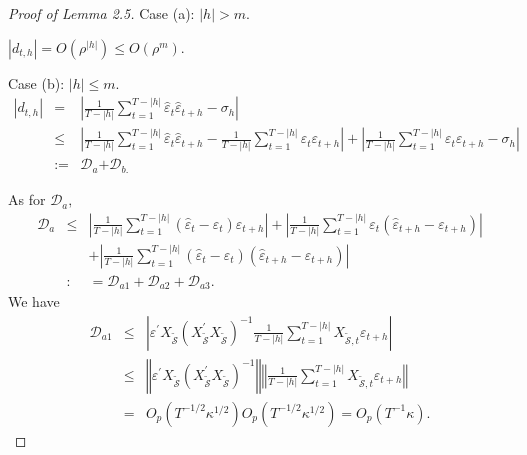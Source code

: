﻿\documentclass[12pt]{article}
\newcommand{\0}{\mbox{\bf 0}}
\theoremstyle{plain}%
\theoremstyle{definition}
\begin{document}
{\begin{proof}[ Proof of Lemma 2.5]
Case (a): $|h|>m.$

$|d_{t,h}|=O\left( \rho ^{|h|}\right) \leq O\left( \rho ^{m}\right) .$

Case (b): $|h|\leq m.$ 
\begin{eqnarray*}
|d_{t,h}| &=&\left\vert \frac{1}{T-|h|}\sum_{t=1}^{T-|h|}\widehat{
\varepsilon }_{t}\widehat{\varepsilon }_{t+h}-\sigma _{h}\right\vert \\
&\leq &\left\vert \frac{1}{T-|h|}\sum_{t=1}^{T-|h|}\widehat{\varepsilon }%
_{t} \widehat{\varepsilon }_{t+h}-\frac{1}{T-|h|}\sum_{t=1}^{T-|h|}%
\varepsilon _{t}\varepsilon _{t+h}\right\vert +\left\vert \frac{1}{T-|h|}
\sum_{t=1}^{T-|h|}\varepsilon _{t}\varepsilon _{t+h}-\sigma _{h}\right\vert
\\
&:=&\mathcal{D}_{a}\mathcal{+D}_{b.}
\end{eqnarray*}

As for $\mathcal{D}_{a},$ 
\begin{eqnarray*}
\mathcal{D}_{a} &\leq &\left\vert \frac{1}{T-|h|}\sum_{t=1}^{T-|h|}\left( 
\widehat{\varepsilon }_{t}-\varepsilon _{t}\right) \varepsilon
_{t+h}\right\vert +\left\vert \frac{1}{T-|h|}\sum_{t=1}^{T-|h|}\varepsilon
_{t}\left( \widehat{\varepsilon }_{t+h}-\varepsilon _{t+h}\right)
\right\vert \\
& &+\left\vert \frac{1}{T-|h|}\sum_{t=1}^{T-|h|}\left( \widehat{
\varepsilon }_{t}-\varepsilon _{t}\right) \left( \widehat{\varepsilon }
_{t+h}-\varepsilon _{t+h}\right) \right\vert \\
&:&=\mathcal{D}_{a1}+\mathcal{D}_{a2}+\mathcal{D}_{a3}.
\end{eqnarray*}
We have 
\begin{eqnarray*}
\mathcal{D}_{a1} &\leq &\left\vert \varepsilon ^{\prime }X_{\widetilde{ 
\mathcal{S}}}\left( X_{\widetilde{\mathcal{S}}}^{\prime }X_{\widetilde{ 
\mathcal{S}}}\right) ^{-1}\frac{1}{T-|h|}\sum_{t=1}^{T-|h|}X_{\widetilde{ 
\mathcal{S}},t}\varepsilon _{t+h}\right\vert \\
&\leq &\left\Vert \varepsilon ^{\prime }X_{\widetilde{\mathcal{S}}}\left(
X_{ \widetilde{\mathcal{S}}}^{\prime }X_{\widetilde{\mathcal{S}}}\right)
^{-1}\right\Vert \left\Vert \frac{1}{T-|h|}\sum_{t=1}^{T-|h|}X_{\widetilde{ 
\mathcal{S}},t}\varepsilon _{t+h}\right\Vert \\
&=&O_{p}\left( T^{-1/2}\kappa ^{1/2}\right) O_{p}\left( T^{-1/2}\kappa
^{1/2}\right) =O_{p}\left( T^{-1}\kappa \right) .
\end{eqnarray*}


\end{proof}}
\end{document}
